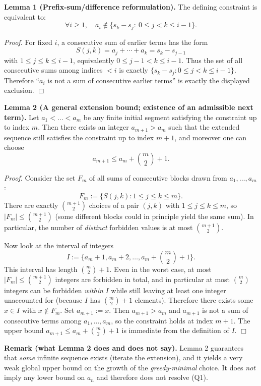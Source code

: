 \medskip
\noindent\textbf{Lemma 1 (Prefix-sum/difference reformulation).}
The defining constraint is equivalent to:
\[
\forall i\ge 1,\quad a_i \notin \{s_k-s_j:\ 0\le j<k\le i-1\}.
\]

\noindent\emph{Proof.}
For fixed $i$, a consecutive sum of earlier terms has the form
\[
S(j,k)=a_j+\cdots+a_k = s_k-s_{j-1}
\]
with $1\le j\le k\le i-1$, equivalently $0\le j-1<k\le i-1$.
Thus the set of all consecutive sums among indices $<i$ is exactly $\{s_k-s_j:0\le j<k\le i-1\}$.
Therefore ``$a_i$ is not a sum of consecutive earlier terms'' is exactly the displayed exclusion. \hfill$\Box$

\medskip
\noindent\textbf{Lemma 2 (A general extension bound; existence of an admissible next term).}
Let $a_1<\dots<a_{m}$ be any finite initial segment satisfying the constraint up to index $m$.
Then there exists an integer $a_{m+1}>a_m$ such that the extended sequence still satisfies the constraint up to index $m+1$, and moreover one can choose
\[
a_{m+1}\le a_m + \binom{m}{2}+1.
\]

\noindent\emph{Proof.}
Consider the set $F_m$ of all sums of consecutive blocks drawn from $a_1,\dots,a_m$:
\[
F_m:=\{S(j,k): 1\le j\le k\le m\}.
\]
There are exactly $\binom{m+1}{2}$ choices of a pair $(j,k)$ with $1\le j\le k\le m$, so $|F_m|\le \binom{m+1}{2}$ (some different blocks could in principle yield the same sum).
In particular, the number of \emph{distinct} forbidden values is at most $\binom{m+1}{2}$.

Now look at the interval of integers
\[
I:=\{a_m+1, a_m+2,\dots, a_m+\binom{m}{2}+1\}.
\]
This interval has length $\binom{m}{2}+1$.
Even in the worst case, at most $|F_m|\le \binom{m+1}{2}$ integers are forbidden in total, and in particular at most $\binom{m}{2}$ integers can be forbidden \emph{within} $I$ while still leaving at least one integer unaccounted for (because $I$ has $\binom{m}{2}+1$ elements).
Therefore there exists some $x\in I$ with $x\notin F_m$.
Set $a_{m+1}:=x$.
Then $a_{m+1}>a_m$ and $a_{m+1}$ is not a sum of consecutive terms among $a_1,\dots,a_m$, so the constraint holds at index $m+1$.
The upper bound $a_{m+1}\le a_m+\binom{m}{2}+1$ is immediate from the definition of $I$. \hfill$\Box$

\medskip
\noindent\textbf{Remark (what Lemma 2 does and does not say).}
Lemma 2 guarantees that \emph{some} infinite sequence exists (iterate the extension), and it yields a very weak global upper bound on the growth of the \emph{greedy-minimal} choice.
It does \emph{not} imply any lower bound on $a_n$ and therefore does not resolve (Q1).

